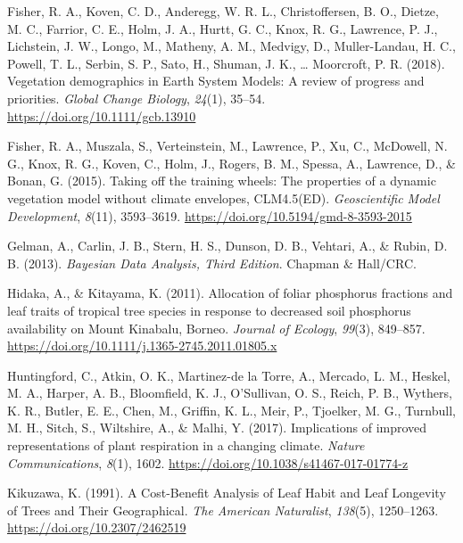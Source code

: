 \documentclass[
  12pt,
  a4paper,
,tablecaptionabove
]{scrartcl}
\newlength{\cslhangindent}
\newenvironment{CSLReferences}[2] %
 {%
  \setlength{\parindent}{0pt}
  \ifodd #1 \everypar{\setlength{\hangindent}{\cslhangindent}}\ignorespaces\fi
  \ifnum #2 > 0
  \setlength{\parskip}{#2\baselineskip}
  \fi
 }%
 {}
\begin{document}
\begin{CSLReferences}{1}{0}
\leavevmode{}%
Fisher, R. A., Koven, C. D., Anderegg, W. R. L., Christoffersen, B. O.,
Dietze, M. C., Farrior, C. E., Holm, J. A., Hurtt, G. C., Knox, R. G.,
Lawrence, P. J., Lichstein, J. W., Longo, M., Matheny, A. M., Medvigy,
D., Muller-Landau, H. C., Powell, T. L., Serbin, S. P., Sato, H.,
Shuman, J. K., \ldots{} Moorcroft, P. R. (2018). Vegetation demographics
in {Earth System Models}: {A} review of progress and priorities.
\emph{Global Change Biology}, \emph{24}(1), 35--54.
\url{https://doi.org/10.1111/gcb.13910}

\leavevmode{}%
Fisher, R. A., Muszala, S., Verteinstein, M., Lawrence, P., Xu, C.,
McDowell, N. G., Knox, R. G., Koven, C., Holm, J., Rogers, B. M.,
Spessa, A., Lawrence, D., \& Bonan, G. (2015). Taking off the training
wheels: The properties of a dynamic vegetation model without climate
envelopes, {CLM4}.5({ED}). \emph{Geoscientific Model Development},
\emph{8}(11), 3593--3619. \url{https://doi.org/10.5194/gmd-8-3593-2015}

\leavevmode{}%
Gelman, A., Carlin, J. B., Stern, H. S., Dunson, D. B., Vehtari, A., \&
Rubin, D. B. (2013). \emph{Bayesian {Data Analysis}, {Third Edition}}.
{Chapman \& Hall/CRC}.

\leavevmode{}%
Hidaka, A., \& Kitayama, K. (2011). Allocation of foliar phosphorus
fractions and leaf traits of tropical tree species in response to
decreased soil phosphorus availability on {Mount Kinabalu}, {Borneo}.
\emph{Journal of Ecology}, \emph{99}(3), 849--857.
\url{https://doi.org/10.1111/j.1365-2745.2011.01805.x}

\leavevmode{}%
Huntingford, C., Atkin, O. K., Martinez-de la Torre, A., Mercado, L. M.,
Heskel, M. A., Harper, A. B., Bloomfield, K. J., O'Sullivan, O. S.,
Reich, P. B., Wythers, K. R., Butler, E. E., Chen, M., Griffin, K. L.,
Meir, P., Tjoelker, M. G., Turnbull, M. H., Sitch, S., Wiltshire, A., \&
Malhi, Y. (2017). Implications of improved representations of plant
respiration in a changing climate. \emph{Nature Communications},
\emph{8}(1), 1602. \url{https://doi.org/10.1038/s41467-017-01774-z}

\leavevmode{}%
Kikuzawa, K. (1991). A {Cost-Benefit Analysis} of {Leaf Habit} and {Leaf
Longevity} of {Trees} and {Their Geographical}. \emph{The American
Naturalist}, \emph{138}(5), 1250--1263.
\url{https://doi.org/10.2307/2462519}


\end{CSLReferences}
\end{document}
